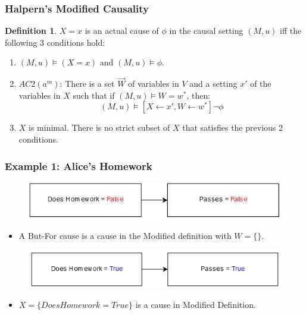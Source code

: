 \documentclass{beamer}
\theoremstyle{plain}
\theoremstyle{definition}
\newtheorem{defn}[thm]{Definition} %
\begin{document}
\begin{frame}
\frametitle{Halpern's Modified Causality}
\begin{defn}$X=x$ is an actual cause of $\phi$ in the causal setting $(M,u)$ iff the following 3 conditions hold:
\begin{enumerate}
\item $(M,u) \models (X=x)$ and $(M,u) \models \phi$.
\item $AC2(a^m)$: There is a set $\vec{W}$ of variables in $V$ and a setting $x'$ of the variables in $X$ such that if $(M,u) \models W = w^*$, then:
\[
(M,u) \models [X \leftarrow x', W \leftarrow w^*] \neg \phi
\]
\item $X$ is minimal. There is no strict subset of $X$ that satisfies the previous 2 conditions.
\end{enumerate}

\end{defn}
\end{frame}

\begin{frame}
\frametitle{Example 1: Alice's Homework}

\begin{figure}
\includegraphics[scale=.5]{aliceModelReal}
\end{figure}

\begin{itemize}
\item A But-For cause is a cause in the Modified definition with $W=\{\}$.
\end{itemize}

\begin{figure}
\includegraphics[scale=.5]{aliceModelCounterfactual}
\end{figure}

\begin{itemize}
\item $X=\{Does Homework = True\}$ is a cause in Modified Definition.
\end{itemize}


\end{frame}
\end{document}

